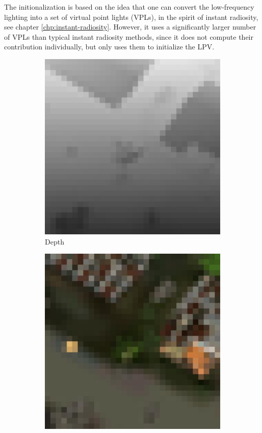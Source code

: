 The initionalization is based on the idea that one can convert the low-frequency lighting into a set of virtual point lights (VPLs), in the spirit of instant radiosity\cite{a:InstantRadiosity}, see chapter \ref{chp:instant-radiosity}. However, it uses a significantly larger number of VPLs than typical instant radiosity methods, since it does not compute their contribution individually, but only uses them to initialize the LPV.

\begin{figure}\label{f:lpv-rsm}
\begin{subfigure}[b]{0.32\textwidth}
	\includegraphics[width=1.0\textwidth]{graphics/lpv/lpv-3-1}
	\caption{Depth}
\end{subfigure}
\begin{subfigure}[b]{0.32\textwidth}
	\includegraphics[width=1.0\textwidth]{graphics/lpv/lpv-3-2}

\end{subfigure}
\end{figure}
